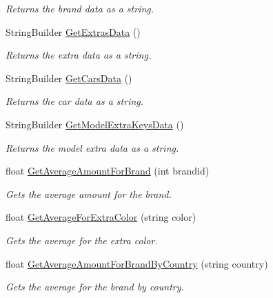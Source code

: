 \begin{DoxyCompactItemize}
\begin{DoxyCompactList}\small\item\em Returns the brand data as a string. \end{DoxyCompactList}\item 
String\+Builder \mbox{\hyperlink{class_car_shop_1_1_logic_1_1_logic_ac829fe0e30078fca2abc5eb64eea4f62}{Get\+Extras\+Data}} ()
\begin{DoxyCompactList}\small\item\em Returns the extra data as a string. \end{DoxyCompactList}\item 
String\+Builder \mbox{\hyperlink{class_car_shop_1_1_logic_1_1_logic_a74048c2231e34ae8d86a5357a073f0cd}{Get\+Cars\+Data}} ()
\begin{DoxyCompactList}\small\item\em Returns the car data as a string. \end{DoxyCompactList}\item 
String\+Builder \mbox{\hyperlink{class_car_shop_1_1_logic_1_1_logic_adffc5bad6d7ef7a2914626b2c27a75c1}{Get\+Model\+Extra\+Keys\+Data}} ()
\begin{DoxyCompactList}\small\item\em Returns the model extra data as a string. \end{DoxyCompactList}\item 
float \mbox{\hyperlink{class_car_shop_1_1_logic_1_1_logic_a267a602b668e129bdf2aba4ce1ea30ed}{Get\+Average\+Amount\+For\+Brand}} (int brandid)
\begin{DoxyCompactList}\small\item\em Gets the average amount for the brand. \end{DoxyCompactList}\item 
float \mbox{\hyperlink{class_car_shop_1_1_logic_1_1_logic_ae9538c7d94f55438dd503f82cfe8ac5c}{Get\+Average\+For\+Extra\+Color}} (string color)
\begin{DoxyCompactList}\small\item\em Gets the average for the extra color. \end{DoxyCompactList}\item 
float \mbox{\hyperlink{class_car_shop_1_1_logic_1_1_logic_a9bf3e72677516747e386faf557a0e105}{Get\+Average\+Amount\+For\+Brand\+By\+Country}} (string country)
\begin{DoxyCompactList}\small\item\em Gets the average for the brand by country. \end{DoxyCompactList}\end{DoxyCompactItemize}
